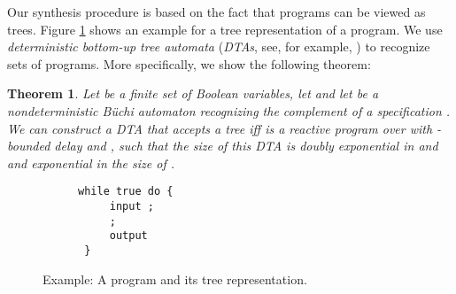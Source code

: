 \documentclass[submission,copyright,creativecommons]{eptcs}
\newtheorem{theorem}{Theorem}
\newcommand{\ignore}[1]{}
\begin{document}
Our synthesis procedure is based on the fact that programs can be
viewed as trees.
Figure \ref{progtreeex} shows an example for a tree representation of a
program.
We use \emph{deterministic bottom-up tree automata} (\emph{DTAs},
see, for example, \cite{rozenberg_languages_1997})
to recognize sets of programs.
More specifically, we show the following theorem:
\begin{theorem}\label{dtatheorem}
	Let  be a finite set of Boolean variables,
	let  and
	let  be a nondeterministic Büchi automaton recognizing the
	complement of a specification
	.
	We can construct a DTA that accepts
	a tree  iff  is a reactive program over  with -bounded delay
	and , such that the size of this DTA
	is doubly exponential in  and  and exponential in the size of
	.
\end{theorem}\ignore{TODO: Time complexity?}
\begin{figure}[h!]
\centering

\setlength{\FrameSep}{\fboxsep-0.5mm}\begin{subfigure}[h]{0.3\linewidth}\ignore{TODO: Better example?}
\begin{framed}
\begin{minipage}[c][3.8cm][c]{\linewidth}\begin{lstlisting}[linewidth=\dimexpr\linewidth-8mm\relax,xleftmargin=2mm]
 while true do {
     input ;
     ;
     output 
 }
\end{lstlisting}
\end{minipage}
\end{framed}
\end{subfigure}
\begin{subfigure}[h]{0.6\linewidth}
\begin{framed}
\begin{minipage}[c][3.8cm]{\linewidth}
\centering
\vspace{2mm}
\vspace{2mm}
\end{minipage}
\end{framed}
\end{subfigure}

\caption{Example: A program and its tree representation.}
\label{progtreeex}
\end{figure}
\end{document}
